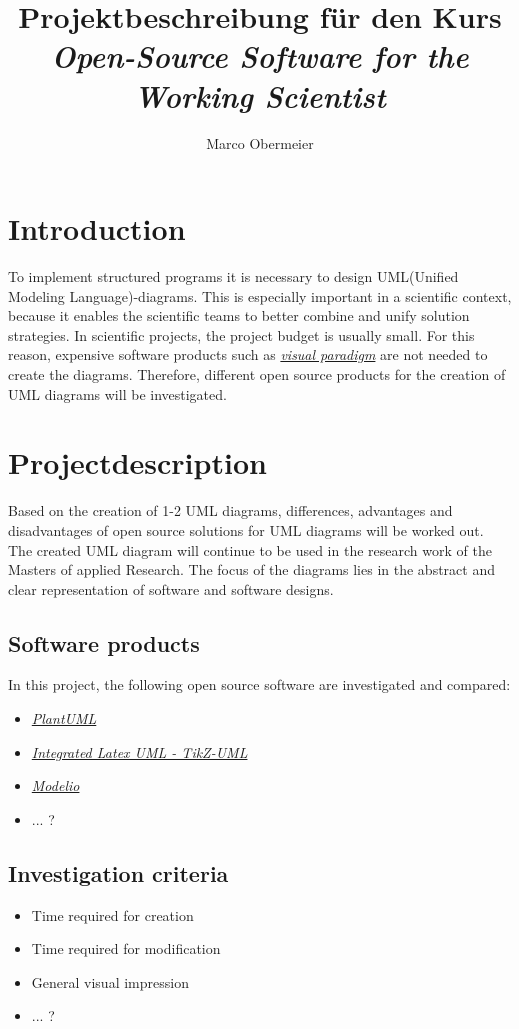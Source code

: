 \documentclass{article}
\title{Projektbeschreibung für den Kurs \\ \textit{Open-Source Software for the Working Scientist}}
\author{Marco Obermeier}
\begin{document}
	\maketitle
	
	\section{Introduction}
	
	To implement structured programs it is necessary to design UML(Unified Modeling Language)-diagrams. 
	This is especially important in a scientific context, because it enables the scientific teams to better combine and unify solution strategies.
	In scientific projects, the project budget is usually small. For this reason, expensive software products such as \href{https://www.visual-paradigm.com/}{\textit{visual paradigm}} are not needed to create the diagrams. Therefore, different open source products for the creation of UML diagrams will be investigated.
	
	
	\section{Projectdescription}
	
	Based on the creation of 1-2 UML diagrams, differences, advantages and disadvantages of open source solutions for UML diagrams will be worked out.
	The created UML diagram will continue to be used in the research work of the Masters of applied Research. 
	The focus of the diagrams lies in the abstract and clear representation of software and software designs.
	
	\subsection{Software products}
	
	In this project, the following open source software are investigated and compared:
	\begin{itemize}
		\item \href{https://plantuml.com/de/}{\textit{PlantUML}}
		\item \href{https://perso.ensta-paris.fr/~kielbasi/tikzuml/index.php}{\textit{Integrated Latex UML - TikZ-UML}}
		\item \href{https://www.modelio.org/}{\textit{Modelio}}
		\item ... ?
	\end{itemize}
	
	
	\subsection{Investigation criteria}

	\begin{itemize}
		\item Time required for creation
		\item Time required for modification
		\item General visual impression
		\item ... ? 
	\end{itemize}
	
	
\end{document}
